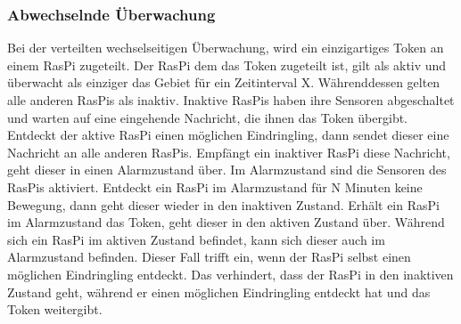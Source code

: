 \documentclass[journal]{IEEEtran}
\begin{document}
\subsubsection{Abwechselnde Überwachung}

Bei der verteilten wechselseitigen Überwachung, wird ein einzigartiges Token an einem RasPi zugeteilt. Der RasPi dem das Token zugeteilt ist, gilt als aktiv und überwacht als einziger das Gebiet für ein Zeitinterval X. Währenddessen gelten alle anderen RasPis als inaktiv. Inaktive RasPis haben ihre Sensoren abgeschaltet und warten auf eine eingehende Nachricht, die ihnen das Token übergibt. Entdeckt der aktive RasPi einen möglichen Eindringling, dann sendet dieser eine Nachricht an alle anderen RasPis. Empfängt ein inaktiver RasPi diese Nachricht, geht dieser in einen Alarmzustand über. Im Alarmzustand sind die Sensoren des RasPis aktiviert. Entdeckt ein RasPi im Alarmzustand für N Minuten keine Bewegung, dann geht dieser wieder in den inaktiven Zustand. Erhält ein RasPi im Alarmzustand das Token, geht dieser in den aktiven Zustand über. Während sich ein RasPi im aktiven Zustand befindet, kann sich dieser auch im Alarmzustand befinden. Dieser Fall trifft ein, wenn der RasPi selbst einen möglichen Eindringling entdeckt. Das verhindert, dass der RasPi in den inaktiven Zustand geht, während er einen möglichen Eindringling entdeckt hat und das Token weitergibt. 
\end{document}
